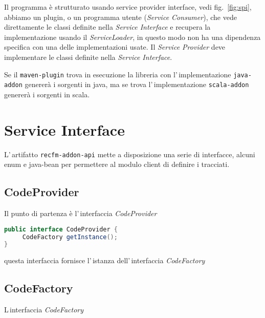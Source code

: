 \documentclass[a4paper,10pt]{report}
\begin{document}
Il programma è strutturato usando service provider interface, 
vedi fig.~\ref{fig:spi}, abbiamo un plugin, o un programma utente 
(\textsl{Service Consumer}), che vede direttamente le classi definite nella 
\textsl{Service Interface} e recupera la implementazione usando il 
\textsl{ServiceLoader}, in questo modo non ha una dipendenza specifica con una
delle implementazioni usate. 
Il \textsl{Service Provider} deve implementare le classi definite nella 
\textsl{Service Interface}.

Se il \verb!maven-plugin! trova in esecuzione la libreria con 
l'\,implementazione \verb!java-addon! genererà i sorgenti in java, ma se trova
l'\,implementazione \verb!scala-addon! genererà i sorgenti in scala.

\chapter{Service Interface}
L'\,artifatto \verb!recfm-addon-api! mette a disposizione una serie di 
interfacce, alcuni enum e java-bean per permettere al modulo client di definire
i tracciati. 

\section{CodeProvider}
Il punto di partenza è l'\,interfaccia \textsl{CodeProvider}

\begin{lstlisting}[language=java, caption=interfaccia CodeProvider, 
label=code:CodeProvider]
public interface CodeProvider {
     CodeFactory getInstance();
}
\end{lstlisting}
questa interfaccia fornisce l'\,istanza dell'\,interfaccia \textsl{CodeFactory}

\section{CodeFactory}
L\,interfaccia \textsl{CodeFactory}
\end{document}
